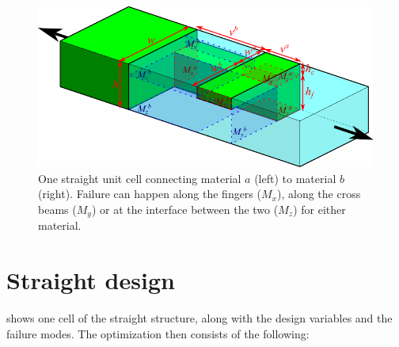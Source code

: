 
\begin{figure}[H]
	\centering
	\includegraphics[width=\columnwidth]{sources/method/straight_model_v3.pdf}
	\caption{
		One straight unit cell connecting material $a$ (left) to material $b$ (right).
		Failure can happen along the fingers ($M_x$), along the cross beams ($M_y$) or at the interface between the two ($M_z$) for either material.}
	\label{fig:failure_modes}
\end{figure}


\section{Straight design}





 shows one cell of the straight structure, along with the design variables and the failure modes.
The optimization then consists of the following:

